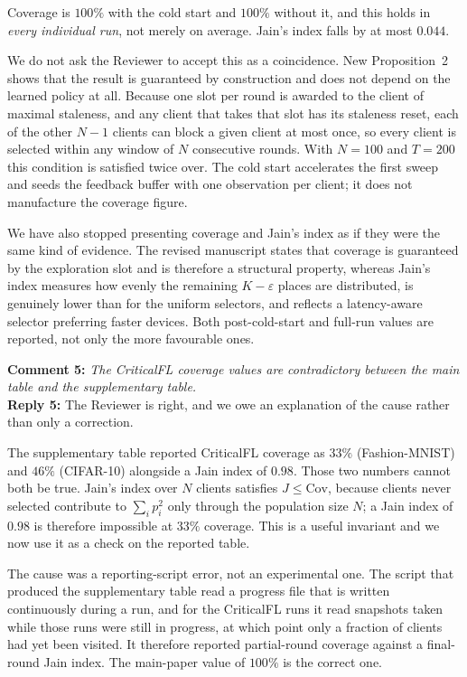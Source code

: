 \documentclass[10pt]{article}
\begin{document}
Coverage is $100\%$ with the cold start and $100\%$ without it, and this holds in \emph{every individual run}, not merely on average. Jain's index falls by at most $0.044$.

We do not ask the Reviewer to accept this as a coincidence. New Proposition~2 shows that the result is guaranteed by construction and does not depend on the learned policy at all. Because one slot per round is awarded to the client of maximal staleness, and any client that takes that slot has its staleness reset, each of the other $N-1$ clients can block a given client at most once, so every client is selected within any window of $N$ consecutive rounds. With $N=100$ and $T=200$ this condition is satisfied twice over. The cold start accelerates the first sweep and seeds the feedback buffer with one observation per client; it does not manufacture the coverage figure.

We have also stopped presenting coverage and Jain's index as if they were the same kind of evidence. The revised manuscript states that coverage is guaranteed by the exploration slot and is therefore a structural property, whereas Jain's index measures how evenly the remaining $K-\varepsilon$ places are distributed, is genuinely lower than for the uniform selectors, and reflects a latency-aware selector preferring faster devices. Both post-cold-start and full-run values are reported, not only the more favourable ones.

\vspace{0.5em}
\noindent
\textbf{Comment 5:} \textit{The CriticalFL coverage values are contradictory between the main table and the supplementary table.}\\
\noindent
\textbf{Reply 5:} The Reviewer is right, and we owe an explanation of the cause rather than only a correction.

The supplementary table reported CriticalFL coverage as $33\%$ (Fashion-MNIST) and $46\%$ (CIFAR-10) alongside a Jain index of $0.98$. Those two numbers cannot both be true. Jain's index over $N$ clients satisfies $J\le \mathrm{Cov}$, because clients never selected contribute to $\sum_i p_i^2$ only through the population size $N$; a Jain index of $0.98$ is therefore impossible at $33\%$ coverage. This is a useful invariant and we now use it as a check on the reported table.

The cause was a reporting-script error, not an experimental one. The script that produced the supplementary table read a progress file that is written continuously during a run, and for the CriticalFL runs it read snapshots taken while those runs were still in progress, at which point only a fraction of clients had yet been visited. It therefore reported partial-round coverage against a final-round Jain index. The main-paper value of $100\%$ is the correct one.
\end{document}
